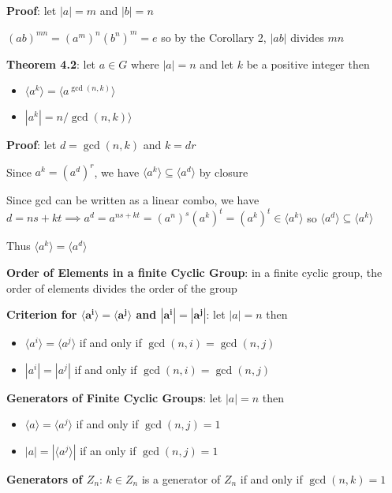 \documentclass{article}
\begin{document}
  \textbf{Proof}: let $|a| = m$ and $|b| = n$

  $(ab)^{mn} = (a^m)^n(b^n)^m = e$ so by the Corollary 2, $|ab|$ divides $mn$

    \bigskip

  \textbf{Theorem 4.2}: let $a \in G$ where $|a| = n$ and let $k$ be a positive integer then 
  \begin{itemize}
    \item $\langle a^k \rangle = \langle a^{\gcd(n, k)} \rangle$
    \item $|a^k| = n / \gcd(n, k) \rangle$
  \end{itemize}

  \textbf{Proof}: let $d = \gcd(n, k)$ and $k = dr$

  Since $a^k = (a^d)^r$, we have $\langle a^k \rangle \subseteq \langle a^d \rangle$ by closure

  Since gcd can be written as a linear combo, we have $d = ns + kt \implies a^d = a^{ns + kt} = (a^n)^s(a^k)^t = (a^k)^t \in \langle a^k \rangle$ so $\langle a^d \rangle \subseteq \langle a^k \rangle$

  Thus $\langle a^k \rangle = \langle a^d \rangle$

  \bigskip

  \textbf{Order of Elements in a finite Cyclic Group}: in a finite cyclic group, the order of elements divides the order of the group

  \textbf{Criterion for $\mathbf{\langle a^i \rangle = \langle a^j \rangle}$ and $\mathbf{|a^i| = |a^j|}$}: let $|a| = n$ then
  \begin{itemize}
    \item $\langle a^i \rangle = \langle a^j \rangle$ if and only if $\gcd(n, i) = \gcd(n, j)$
    \item $|a^i| = |a^j|$ if and only if $\gcd(n, i) = \gcd(n, j)$
  \end{itemize}

  \textbf{Generators of Finite Cyclic Groups}: let $|a| = n$ then
  \begin{itemize}
    \item $\langle a \rangle = \langle a^j \rangle$ if and only if $\gcd(n, j) = 1$
    \item $|a| = |\langle a^j \rangle |$ if an only if $\gcd(n, j) = 1$
  \end{itemize}

  \textbf{Generators of $Z_n$}: $k \in Z_n$ is a generator of $Z_n$ if and only if $\gcd(n, k) = 1$
\end{document}
